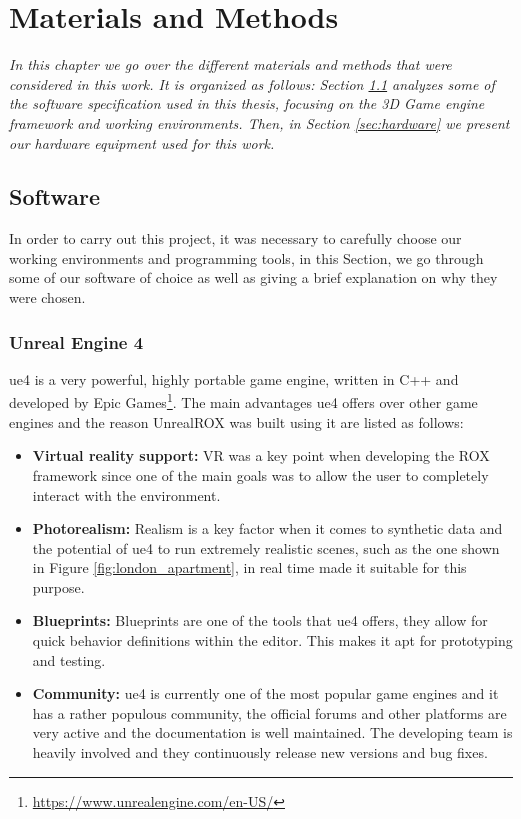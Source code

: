 
\chapter{Materials and Methods}
\label{metodologia}

\textit{In this chapter we go over the different materials and methods that were considered in this work. It is organized as follows: Section \ref{sec:software} analyzes some of the software specification used in this thesis, focusing on the 3D Game engine framework and working environments. Then, in Section \ref{sec:hardware} we present our hardware equipment used for this work.}

\section{Software}
\label{sec:software}
In order to carry out this project, it was necessary to carefully choose our working environments and programming tools, in this Section, we go through some of our software of choice as well as giving a brief explanation on why they were chosen.

\subsection{Unreal Engine 4}
\gls{ue4} is a very powerful, highly portable game engine, written in C++ and developed by Epic Games\footnote{\url{https://www.unrealengine.com/en-US/}}.
The main advantages \gls{ue4} offers over other game engines and the reason UnrealROX was built using it are listed as follows:

\begin{itemize}
	\item \textbf{Virtual reality support:} VR was a key point when developing the ROX framework since one of the main goals was to allow the user to completely interact with the environment.
	\item \textbf{Photorealism:} Realism is a key factor when it comes to synthetic data and the potential of \gls{ue4} to run extremely realistic scenes, such as the one shown in Figure \ref{fig:london_apartment}, in real time made it suitable for this purpose.
	\item \textbf{Blueprints:} Blueprints are one of the tools that \gls{ue4} offers, they  allow for quick behavior definitions within the editor. This makes it apt for prototyping and testing.
	\item \textbf{Community:} \gls{ue4} is currently one of the most popular game engines and it has a rather populous community, the official forums and other platforms are very active and the documentation is well maintained. The developing team is heavily involved and they continuously release new versions and bug fixes. 
\end{itemize}

